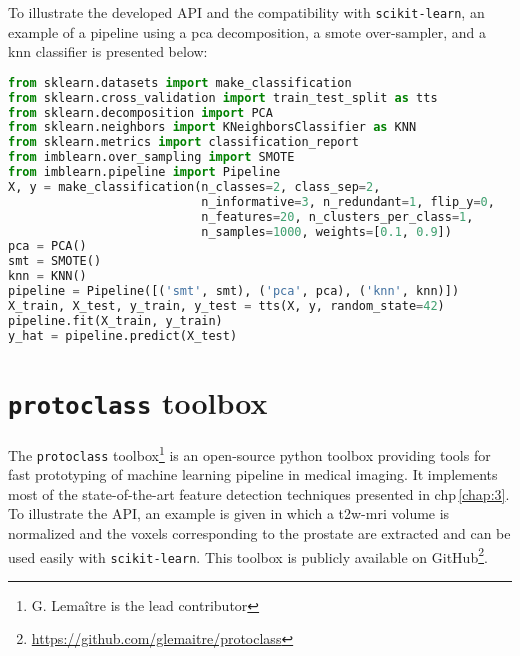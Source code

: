 To illustrate the developed API and the compatibility with \texttt{scikit-learn}, an example of a pipeline using a \ac{pca} decomposition, a \ac{smote} over-sampler, and a \ac{knn} classifier is presented below:

\begin{lstlisting}[language=Python, caption=Code snippet to over-sample a dataset using \acs*{smote} in conjunction with \ac{pca} and a \ac{knn} classifier.]
from sklearn.datasets import make_classification
from sklearn.cross_validation import train_test_split as tts
from sklearn.decomposition import PCA
from sklearn.neighbors import KNeighborsClassifier as KNN
from sklearn.metrics import classification_report
from imblearn.over_sampling import SMOTE
from imblearn.pipeline import Pipeline
X, y = make_classification(n_classes=2, class_sep=2,
                           n_informative=3, n_redundant=1, flip_y=0,
                           n_features=20, n_clusters_per_class=1,
                           n_samples=1000, weights=[0.1, 0.9])
pca = PCA()
smt = SMOTE()
knn = KNN()
pipeline = Pipeline([('smt', smt), ('pca', pca), ('knn', knn)])
X_train, X_test, y_train, y_test = tts(X, y, random_state=42)
pipeline.fit(X_train, y_train)
y_hat = pipeline.predict(X_test)
\end{lstlisting}

\section{\texttt{protoclass} toolbox}\label{chp4:sec:protoclass}

The \texttt{protoclass} toolbox\footnote{G. Lema\^itre is the lead contributor} is an open-source python toolbox providing tools for fast prototyping of machine learning pipeline in medical imaging.
It implements most of the state-of-the-art feature detection techniques presented in \acs{chp}\,\ref{chap:3}.
To illustrate the API, an example is given in which a \ac{t2w}-\ac{mri} volume is normalized and the voxels corresponding to the prostate are extracted and can be used easily with \texttt{scikit-learn}.
This toolbox is publicly available on GitHub\footnote{\url{https://github.com/glemaitre/protoclass}}.

